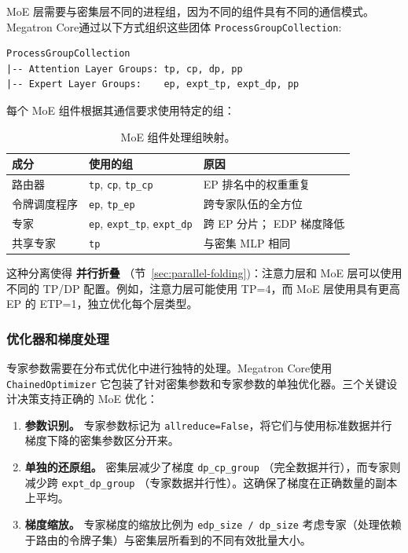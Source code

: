 \documentclass[10pt,logo,copyright]{nvidiatechreport_zh}
\begin{document}
MoE 层需要与密集层不同的进程组，因为不同的组件具有不同的通信模式。Megatron Core通过以下方式组织这些团体 \texttt{ProcessGroupCollection}:

\begin{lstlisting}
ProcessGroupCollection
|-- Attention Layer Groups: tp, cp, dp, pp
|-- Expert Layer Groups:    ep, expt_tp, expt_dp, pp
\end{lstlisting}

每个 MoE 组件根据其通信要求使用特定的组：

\begin{table}[ht]
\centering
\begin{tabular}{lll}
\toprule
\textbf{成分} & \textbf{使用的组} & \textbf{原因} \\
\midrule
路由器 & \texttt{tp}, \texttt{cp}, \texttt{tp\_cp} & EP 排名中的权重重复 \\
令牌调度程序 & \texttt{ep}, \texttt{tp\_ep} & 跨专家队伍的全方位 \\
专家 & \texttt{ep}, \texttt{expt\_tp}, \texttt{expt\_dp} & 跨 EP 分片； EDP​​ 梯度降低 \\
共享专家 & \texttt{tp} & 与密集 MLP 相同 \\
\bottomrule
\end{tabular}
\caption{MoE 组件处理组映射。}
\label{tab:moe-process-groups}
\end{table}

这种分离使得 \textbf{并行折叠} （节~\ref{sec:parallel-folding})：注意力层和 MoE 层可以使用不同的 TP/DP 配置。例如，注意力层可能使用 TP=4，而 MoE 层使用具有更高 EP 的 ETP=1，独立优化每个层类型。

\subsubsection{优化器和梯度处理}

专家参数需要在分布式优化中进行独特的处理。Megatron Core使用 \texttt{Chained\-Optimizer} 它包装了针对密集参数和专家参数的单独优化器。三个关键设计决策支持正确的 MoE 优化：

\begin{enumerate}
    \item \textbf{参数识别。} 专家参数标记为 \texttt{allreduce=False}，将它们与使用标准数据并行梯度下降的密集参数区分开来。

    \item \textbf{单独的还原组。} 密集层减少了梯度 \texttt{dp\_cp\_group} （完全数据并行），而专家则减少跨 \texttt{expt\_dp\_group} （专家数据并行性）。这确保了梯度在正确数量的副本上平均。

    \item \textbf{梯度缩放。} 专家梯度的缩放比例为 \texttt{edp\_size / dp\_size} 考虑专家（处理依赖于路由的令牌子集）与密集层所看到的不同有效批量大小。
\end{enumerate}
\end{document}
